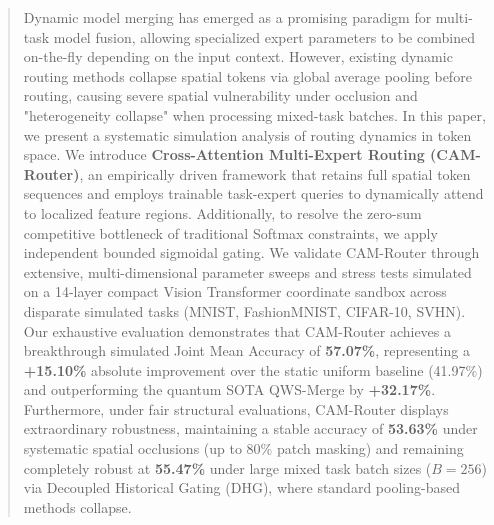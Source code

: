 \begin{abstract}
Dynamic model merging has emerged as a promising paradigm for multi-task model fusion, allowing specialized expert parameters to be combined on-the-fly depending on the input context. However, existing dynamic routing methods collapse spatial tokens via global average pooling before routing, causing severe spatial vulnerability under occlusion and "heterogeneity collapse" when processing mixed-task batches. In this paper, we present a systematic simulation analysis of routing dynamics in token space. We introduce \textbf{Cross-Attention Multi-Expert Routing (CAM-Router)}, an empirically driven framework that retains full spatial token sequences and employs trainable task-expert queries to dynamically attend to localized feature regions. Additionally, to resolve the zero-sum competitive bottleneck of traditional Softmax constraints, we apply independent bounded sigmoidal gating. We validate CAM-Router through extensive, multi-dimensional parameter sweeps and stress tests simulated on a 14-layer compact Vision Transformer coordinate sandbox across disparate simulated tasks (MNIST, FashionMNIST, CIFAR-10, SVHN). Our exhaustive evaluation demonstrates that CAM-Router achieves a breakthrough simulated Joint Mean Accuracy of \textbf{57.07\%}, representing a \textbf{+15.10\%} absolute improvement over the static uniform baseline (41.97\%) and outperforming the quantum SOTA QWS-Merge by \textbf{+32.17\%}. Furthermore, under fair structural evaluations, CAM-Router displays extraordinary robustness, maintaining a stable accuracy of \textbf{53.63\%} under systematic spatial occlusions (up to 80\% patch masking) and remaining completely robust at \textbf{55.47\%} under large mixed task batch sizes ($B=256$) via Decoupled Historical Gating (DHG), where standard pooling-based methods collapse.
\end{abstract}